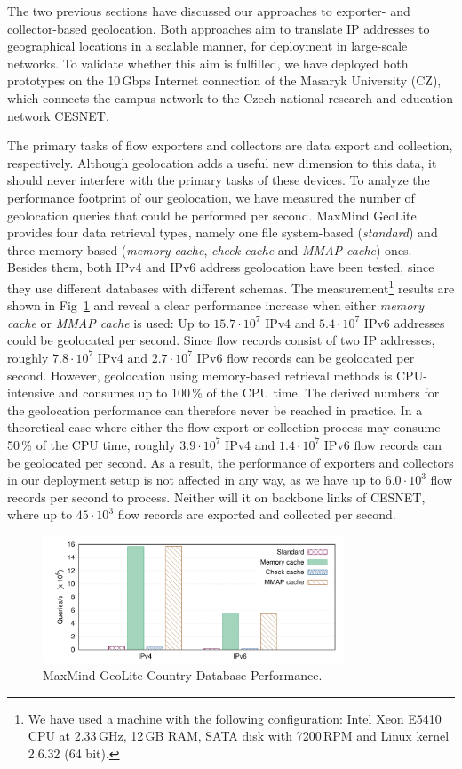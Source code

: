 The two previous sections have discussed our approaches to exporter- and collector-based geolocation. Both approaches aim to translate IP addresses to geographical locations in a scalable manner, for deployment in large-scale networks. To validate whether this aim is fulfilled, we have deployed both prototypes on the 10\,Gbps Internet connection of the Masaryk University (CZ), which connects the campus network to the Czech national research and education network CESNET.

The primary tasks of flow exporters and collectors are data export and collection, respectively. Although geolocation adds a useful new dimension to this data, it should never interfere with the primary tasks of these devices. To analyze the performance footprint of our geolocation, we have measured the number of geolocation queries that could be performed per second. MaxMind GeoLite provides four data retrieval types, namely one file system-based (\textit{standard}) and three memory-based (\textit{memory cache}, \textit{check cache} and \textit{MMAP cache}) ones. Besides them, both IPv4 and IPv6 address geolocation have been tested, since they use different databases with different schemas. The measurement\footnote{We have used a machine with the following configuration: Intel Xeon E5410 CPU at 2.33\,GHz, 12\,GB RAM, SATA disk with 7200\,RPM and Linux kernel 2.6.32 (64 bit).} results are shown in Fig~\ref{fig:geo-mm-perf} and reveal a clear performance increase when either \textit{memory cache} or \textit{MMAP cache} is used: Up to $15.7 \cdot 10^7$ IPv4 and $5.4 \cdot 10^7$ IPv6 addresses could be geolocated per second. Since flow records consist of two IP addresses, roughly $7.8 \cdot 10^7$ IPv4 and $2.7 \cdot 10^7$ IPv6 flow records can be geolocated per second. However, geolocation using memory-based retrieval methods is CPU-intensive and consumes up to 100\,\% of the CPU time. The derived numbers for the geolocation performance can therefore never be reached in practice. In a theoretical case where either the flow export or collection process may consume 50\,\% of the CPU time, roughly $3.9 \cdot 10^7$ IPv4 and $1.4 \cdot 10^7$ IPv6 flow records can be geolocated per second. As a result, the performance of exporters and collectors in our deployment setup is not affected in any way, as we have up to $6.0 \cdot 10^3$ flow records per second to process. Neither will it on backbone links of CESNET, where up to $45 \cdot 10^3$ flow records are exported and collected per second.

\begin{figure}[!tb]
    \centering
    \includegraphics[width=0.8\textwidth]{figures/paper-geolocation/performance/performance}
    \caption{MaxMind GeoLite Country Database Performance.}
    \label{fig:geo-mm-perf}
\end{figure}

